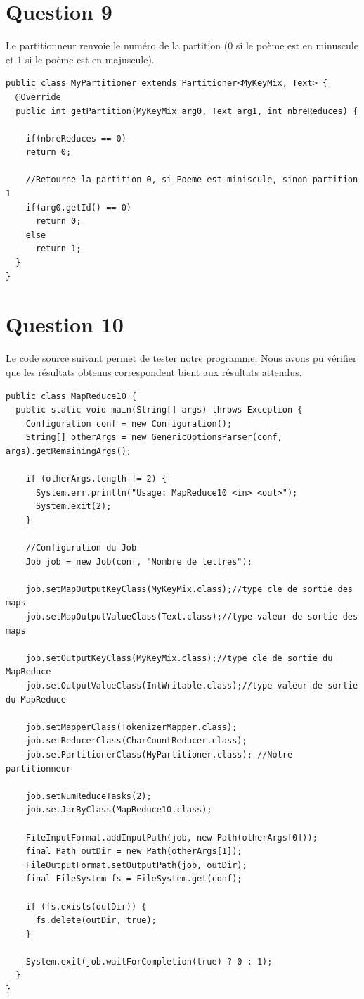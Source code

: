 \documentclass{article}
\begin{document}
  \section*{Question 9}

    Le partitionneur renvoie le numéro de la partition ($0$ si le poème
    est en minuscule et $1$ si le poème est en majuscule). \medskip

\begin{lstlisting}
public class MyPartitioner extends Partitioner<MyKeyMix, Text> {
  @Override
  public int getPartition(MyKeyMix arg0, Text arg1, int nbreReduces) {
		
    if(nbreReduces == 0)
    return 0;
		
    //Retourne la partition 0, si Poeme est miniscule, sinon partition 1
    if(arg0.getId() == 0)
      return 0;
    else 
      return 1;
  }
}
\end{lstlisting}

  \section*{Question 10} 

    Le code source suivant permet de tester notre programme. Nous avons pu
    vérifier que les résultats obtenus correspondent bient aux résultats
    attendus. \medskip

\begin{lstlisting}
public class MapReduce10 {
  public static void main(String[] args) throws Exception {
    Configuration conf = new Configuration();
    String[] otherArgs = new GenericOptionsParser(conf, args).getRemainingArgs();
		
    if (otherArgs.length != 2) {
      System.err.println("Usage: MapReduce10 <in> <out>");
      System.exit(2);
    }
		
    //Configuration du Job
    Job job = new Job(conf, "Nombre de lettres");
		
    job.setMapOutputKeyClass(MyKeyMix.class);//type cle de sortie des maps
    job.setMapOutputValueClass(Text.class);//type valeur de sortie des maps	    
		
    job.setOutputKeyClass(MyKeyMix.class);//type cle de sortie du MapReduce
    job.setOutputValueClass(IntWritable.class);//type valeur de sortie du MapReduce

    job.setMapperClass(TokenizerMapper.class);
    job.setReducerClass(CharCountReducer.class);
    job.setPartitionerClass(MyPartitioner.class); //Notre partitionneur
    
    job.setNumReduceTasks(2);
    job.setJarByClass(MapReduce10.class); 		
		
    FileInputFormat.addInputPath(job, new Path(otherArgs[0]));
    final Path outDir = new Path(otherArgs[1]);
    FileOutputFormat.setOutputPath(job, outDir);
    final FileSystem fs = FileSystem.get(conf);
    
    if (fs.exists(outDir)) {
      fs.delete(outDir, true);
    }
	   
    System.exit(job.waitForCompletion(true) ? 0 : 1);
  }
}
\end{lstlisting}
\end{document}
